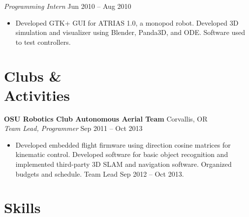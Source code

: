 \documentclass[10pt,letterpaper,margin]{res}
\begin{document}
\begin{resume}
{\it Programming Intern} \hfill {\color{lightgray} Jun 2010 -- Aug 2010}\vspace{0.0em}

\begin{itemize}
	\item Developed GTK+ GUI for ATRIAS 1.0, a monopod robot. Developed 3D
		simulation and visualizer using Blender, Panda3D, and ODE. Software
		used to test controllers.
\end{itemize}



\section{Clubs \& \\ Activities}

{\bf OSU Robotics Club Autonomous Aerial Team} \hfill {\color{lightgray} Corvallis, OR} \\
{\it Team Lead, Programmer} \hfill {\color{lightgray} Sep 2011 -- Oct 2013}\vspace{0.0em}

\begin{itemize}
	\item Developed embedded flight firmware using direction cosine matrices
		for kinematic control. Developed software for basic object recognition
		and implemented third-party 3D SLAM and navigation software.  Organized
		budgets and schedule. Team Lead Sep 2012 -- Oct 2013.
\end{itemize}



%
%


\section{Skills}


\end{resume}
\end{document}
